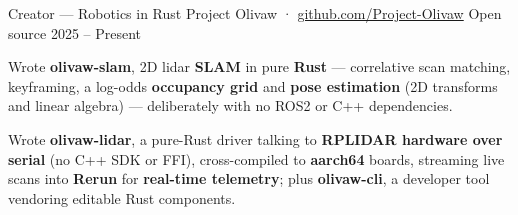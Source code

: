 
\begin{cventries}

  \cventry
  {Creator --- Robotics in Rust}
  {Project Olivaw · \href{https://github.com/Project-Olivaw}{github.com/Project-Olivaw}}
  {Open source}
  {2025 -- Present}
  {
    \begin{cvitems}
      \item {Wrote \textbf{olivaw-slam}, 2D lidar \textbf{SLAM} in pure \textbf{Rust} --- correlative scan matching, keyframing, a log-odds \textbf{occupancy grid} and \textbf{pose estimation} (2D transforms and linear algebra) --- deliberately with no ROS2 or C++ dependencies.}
      \item {Wrote \textbf{olivaw-lidar}, a pure-Rust driver talking to \textbf{RPLIDAR hardware over serial} (no C++ SDK or FFI), cross-compiled to \textbf{aarch64} boards, streaming live scans into \textbf{Rerun} for \textbf{real-time telemetry}; plus \textbf{olivaw-cli}, a developer tool vendoring editable Rust components.}
    \end{cvitems}
  }

\end{cventries}
